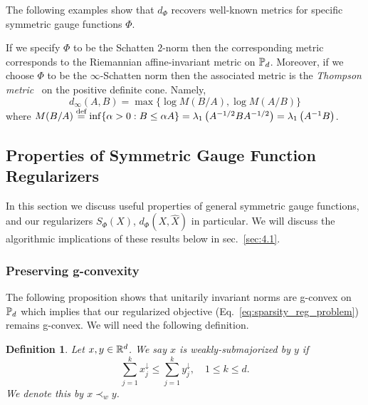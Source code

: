 \documentclass[sn-nature]{sn-jnl}%
\theoremstyle{thmstyleone}%
\newtheorem{defn}{Definition}
\theoremstyle{thmstyletwo}%
\theoremstyle{thmstylethree}%
\begin{document}
The following examples show that $d_\Phi$ recovers well-known metrics for specific symmetric gauge functions $\Phi$.


\begin{example}
    If we specify $\Phi$ to be the Schatten $2$-norm then the corresponding metric corresponds to the Riemannian affine-invariant metric on $\mathbb{P}_d$. Moreover, if we choose $\Phi$ to be the $\infty$-Schatten norm then the associated metric is the \textit{Thompson metric}~\cite{thompson1963certain} on the positive definite cone. Namely,
    $$
d_{\infty}(A, B) = \max \{\log M(B / A), \log M(A / B)\}
$$
where $M(B / A) \stackrel{\text{def}}{=} \inf \{\alpha>0: B \leq \alpha A\}=\lambda_1\left(A^{-1 / 2} B A^{-1 / 2}\right)=\lambda_1\left(A^{-1} B\right)$. 
\end{example}











\subsection{Properties of Symmetric Gauge Function Regularizers}\label{section:Algo_benefit_SG}
In this section we discuss useful properties of general symmetric gauge functions, and our regularizers $S_\Phi(X)$, $d_\Phi(X,\hat{X})$ in particular. We will discuss the algorithmic implications of these results below in sec.~\ref{sec:4.1}.

\subsubsection{Preserving g-convexity}
The following proposition shows that unitarily invariant norms are g-convex on $\mathbb{P}_d$ which implies that our regularized objective (Eq.~\ref{eq:sparsity_reg_problem}) remains g-convex. We will need the following definition.


\begin{defn}
    Let $x, y \in \mathbb{R}^d$. We say \emph{$x$ is weakly-submajorized by $y$} if 
    \[
    \sum_{j=1}^k x_j^{\downarrow} \leq \sum_{j=1}^k y_j^{\downarrow}, \quad 1 \leq k \leq d.
    \]
    We denote this by $x \prec_w y$.
\end{defn}
\end{document}
